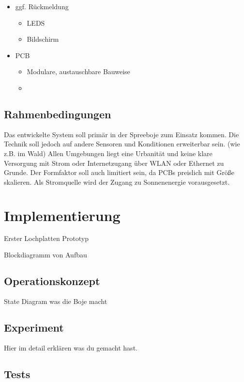 \begin{itemize}
\begin{itemize}
        \item ESP32 Intern
        \item ggf. Externer ADC per I2C
    \end{itemize}
    \item ggf. Rückmeldung
    \begin{itemize}
        \item LEDS
        \item Bildschirm
    \end{itemize}
    \item PCB
    \begin{itemize}
        \item Modulare, austauschbare Bauweise
        \item 
    \end{itemize}
\end{itemize}

\subsection{Rahmenbedingungen}
Das entwickelte System soll primär in der Spreeboje zum Einsatz kommen.
Die Technik soll jedoch auf andere Sensoren und Konditionen erweiterbar sein.
(wie z.B. im Wald)
Allen Umgebungen liegt eine Urbanität und keine klare Versorgung mit Strom oder Internetzugang über \ac{WLAN} oder Ethernet zu Grunde.
Der Formfaktor soll auch limitiert sein, da \ac{PCB}s preislich mit Größe skalieren. 
Als Stromquelle wird der Zugang zu Sonnenenergie vorausgesetzt.




\section{Implementierung}

Erster Lochplatten Prototyp


Blockdiagramm von Aufbau

\subsection{Operationskonzept}

State Diagram was die Boje macht


\subsection{Experiment}

Hier im detail erklären was du gemacht hast. 
\subsection{Tests}

